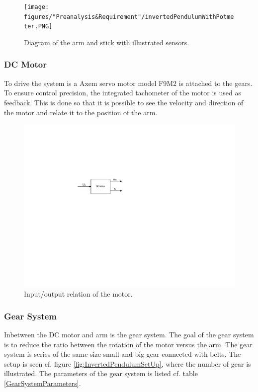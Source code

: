 \begin{figure} [htbp]
	\centering
	\texttt{[image: figures/"Preanalysis\&Requirement"/invertedPendulumWithPotmeter.PNG]}
	\caption{Diagram of the arm and stick with illustrated sensors.} \label{fig:InvertedPendulumSetUpPotmeter}
\end{figure}



\subsubsection{DC Motor}
To drive the system is a Axem servo motor model F9M2 is attached to the gears. To ensure control precision, the integrated tachometer of the motor is used as feedback. This is done so that it is possible to see the velocity and direction of the motor and relate it to the position of the arm.

\begin{figure} [htbp]
	\centering
	\includegraphics[width=0.7\linewidth]{figures/modeling/DCMotorRelation.pdf}
	\caption{Input/output relation of the motor.} \label{fig:DCMotorRelation}
\end{figure}




\subsubsection{Gear System}
Inbetween the DC motor and arm is the gear system. The goal of the gear system is to reduce the ratio between the rotation of the motor versus the arm. The gear system is series of the same size small and big gear connected with belts. The setup is seen cf. figure \ref{fig:InvertedPendulumSetUp}, where the number of gear is illustrated. The parameters of the gear system is listed cf. table \ref{GearSystemParameters}.   

